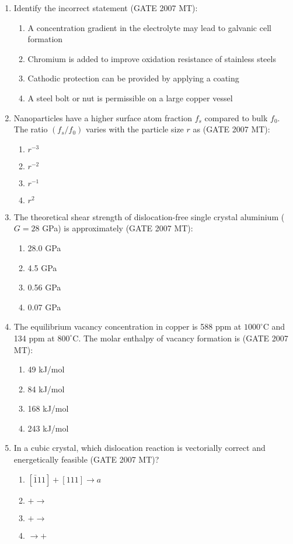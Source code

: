 \documentclass[12pt]{article}
\begin{document}
\begin{enumerate}
\item Identify the incorrect statement (GATE 2007 MT):  
  \begin{enumerate}[label=(\Alph*)]
    \item A concentration gradient in the electrolyte may lead to galvanic cell formation
    \item Chromium is added to improve oxidation resistance of stainless steels
    \item Cathodic protection can be provided by applying a coating
    \item A steel bolt or nut is permissible on a large copper vessel
  \end{enumerate}

\item Nanoparticles have a higher surface atom fraction $f_s$ compared to bulk $f_0$. The ratio $(f_s/f_0)$ varies with the particle size $r$ as (GATE 2007 MT):  
  \begin{enumerate}[label=(\Alph*)]
    \item $r^{-3}$
    \item $r^{-2}$
    \item $r^{-1}$
    \item $r^{2}$
  \end{enumerate}

\item The theoretical shear strength of dislocation-free single crystal aluminium ($G = 28$ GPa) is approximately (GATE 2007 MT):  
  \begin{enumerate}[label=(\Alph*)]
    \item 28.0 GPa
    \item 4.5 GPa
    \item 0.56 GPa
    \item 0.07 GPa
  \end{enumerate}

\item The equilibrium vacancy concentration in copper is 588 ppm at $1000^\circ$C and 134 ppm at $800^\circ$C. The molar enthalpy of vacancy formation is (GATE 2007 MT):  
  \begin{enumerate}[label=(\Alph*)]
    \item 49 kJ/mol
    \item 84 kJ/mol
    \item 168 kJ/mol
    \item 243 kJ/mol
  \end{enumerate}

\item In a cubic crystal, which dislocation reaction is vectorially correct and energetically feasible (GATE 2007 MT)?  
  \begin{enumerate}[label=(\Alph*)]
    \item $[\bar{1}11] + [111] \to a$
    \item $ +  \to $
    \item $ +  \to $
    \item $ \to  + $
  \end{enumerate}


\end{enumerate}
\end{document}
